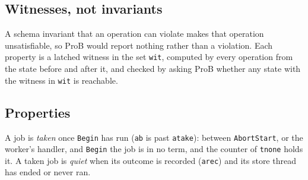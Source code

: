 \documentclass[a4paper,10pt,fleqn]{article}
\newcommand{\field}[1]{\texttt{#1}}
\begin{document}
\subsection{Witnesses, not invariants}

A schema invariant that an operation can violate makes that operation
unsatisfiable, so ProB would report nothing rather than a violation. Each
property is a latched witness in the set \field{wit}, computed by every operation
from the state before and after it, and checked by asking ProB whether any state
with the witness in \field{wit} is reachable.

\subsection{Properties}

A job is \emph{taken} once \field{Begin} has run (\field{ab} is past
\field{atake}): between \field{AbortStart}, or the worker's handler, and
\field{Begin} the job is in no term, and the counter of \field{tnone} holds it.
A taken job is \emph{quiet} when its outcome is recorded (\field{arec}) and its
store thread has ended or never ran.
\end{document}
